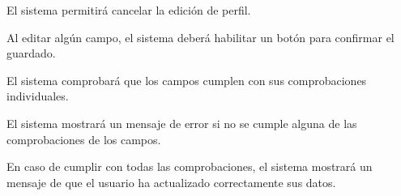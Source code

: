 \begin{enumitem}[label=\bfseries{RPer \arabic*.},leftmargin=*]
\begin{enumitem}[label*=\bfseries{\arabic*.}]
		\item El sistema permitirá cancelar la edición de perfil.
		\item Al editar algún campo, el sistema deberá habilitar un botón para confirmar el guardado.
		\begin{enumitem}[label*=\bfseries{\arabic*.}]
			\item El sistema comprobará que los campos cumplen con sus comprobaciones individuales.
			\begin{enumitem}[label*=\bfseries{\arabic*.}]
				\item El sistema mostrará un mensaje de error si no se cumple alguna de las comprobaciones de los campos.
				\item En caso de cumplir con todas las comprobaciones, el sistema mostrará un mensaje de que el usuario ha actualizado correctamente sus datos.
			\end{enumitem}
		\end{enumitem}
	\end{enumitem}


\end{enumitem}
